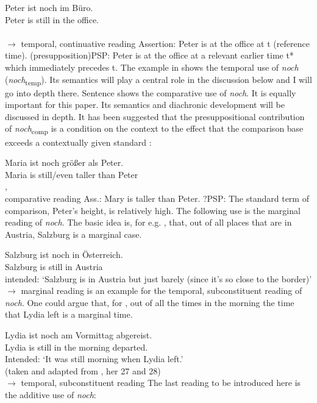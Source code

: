 \documentclass[output=paper
,modfonts
,nonflat]{langsci/langscibook}
\begin{document}
\ea\gll Peter ist noch im Büro.\\
        Peter is still {in the} office.\\
\\ \hfill $\rightarrow$ temporal, continuative reading \label{NOCH_TEMP_cont_EXP}
\z
\ea\ea Assertion: Peter is at the office at t (reference time).
\ex      (presupposition)PSP: Peter is at the office at a relevant earlier time t* which immediately precedes t.
\z\z
The example in  shows the temporal use of \textit{noch} (\textit{noch}\textsubscript{temp}). Its semantics will play a central role in the discussion below and I will go into depth there. Sentence  shows the comparative use of \textit{noch}. It is equally important for this paper. Its semantics and diachronic development will be discussed in depth. It has been suggested that the presuppositional contribution of \textit{noch}\textsubscript{comp} is a condition on the context to the effect that the comparison base exceeds a contextually given standard \citep[e.g.][]{Hofstetter2013}:

\ea\gll Maria ist noch größer als Peter.\\
       Maria is still/even taller than Peter\\
, \\ \hfill comparative reading \label{NOCH_COMP_EXP_0}
\z
\ea\ea Ass.: Mary is taller than Peter.
\ex    ?PSP: The standard term of comparison, Peter's height, is relatively high.
\z\z
The following use is the marginal reading of \textit{noch}. The basic idea is, for e.g. , that, out of all places that are in Austria, Salzburg is a marginal case.

\ea\gll Salzburg ist noch in Österreich.\\
       Salzburg is still in Austria \\
\glt   intended: {`Salzburg is in Austria but just barely (since it's so close to the border)'} \\ \hfill $\rightarrow$ marginal reading \label{NOCH_MARG_deg_EXP}
\z
{} is an example for the temporal, subconstituent reading of \textit{noch}. One could argue that, for , out of all the times in the morning the time that Lydia left is a marginal time.

\ea\gll Lydia ist noch am Vormittag abgereist.\\
       Lydia is still {in the} morning departed.\\
\glt   Intended: {`It was still morning when Lydia left.'}\\ \hfill \small{(taken and adapted from \citealt{Beck2017}, her 27 and 28)}\\ \normalsize \hfill $\rightarrow$ temporal, subconstituent reading \label{NOCH_TEMP_subconst_EXP}
\z
The last reading to be introduced here is the additive use of \textit{noch}:
\end{document}
